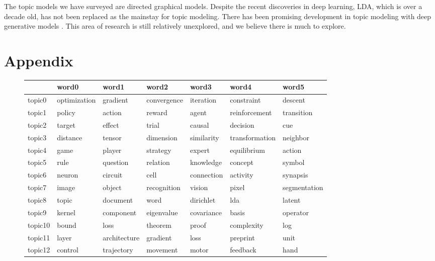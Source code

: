 \documentclass[letterpaper]{article}
\begin{document}
The topic models we have surveyed are directed graphical models.
Despite the recent discoveries in deep learning, LDA, which is over a
decade old, has not been replaced as the mainstay for topic modeling.
There has been promising development in topic modeling with deep
generative models \cite{hinton2009replicated, larochelle2012neural,
  cao2015novel}. This area of research is still relatively unexplored,
and we believe there is much to explore.



\onecolumn

\section{Appendix}
\label{sec:appendix}

\begin{figure}[ht]
  \centering
  \begin{tabular}{l | l l l l l l}
    &     word0    &      word1 &          word2 &         word3 & word4 &        word5 \\ \hline
    topic0 & optimization & gradient & convergence & iteration & constraint & descent \\
    topic1 & policy & action & reward & agent & reinforcement & transition \\
    topic2 & target & effect & trial & causal & decision & cue \\
    topic3 & distance & tensor & dimension & similarity & transformation & neighbor \\
    topic4 & game & player & strategy & expert & equilibrium & action \\
    topic5 & rule & question & relation & knowledge & concept & symbol \\
    topic6 & neuron & circuit & cell & connection & activity & synapsis \\
    topic7 & image & object & recognition & vision & pixel & segmentation \\
    topic8 & topic & document & word & dirichlet & lda & latent \\
    topic9 & kernel & component & eigenvalue & covariance & basis & operator \\
    topic10 & bound & loss & theorem & proof & complexity & log \\
    topic11 & layer & architecture & gradient & loss & preprint & unit \\
    topic12 & control & trajectory & movement & motor & feedback & hand \\

\end{tabular}
\end{figure}
\end{document}
